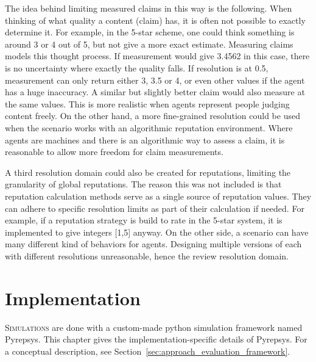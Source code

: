 \documentclass[%
    ]{\PathToTumTemplate/thesis/tum_thesis}
\begin{document}
The idea behind limiting measured claims in this way is the following.
When thinking of what quality a content (claim) has, it is often not possible to exactly determine it.
For example, in the 5-star scheme, one could think something is around 3 or 4 out of 5, but not give a more exact estimate.
Measuring claims models this thought process.
If measurement would give 3.4562 in this case, there is no uncertainty where exactly the quality falls.
If resolution is at 0.5, measurement can only return either 3, 3.5 or 4, or even other values if the agent has a huge inaccuracy.
A similar but slightly better claim would also measure at the same values.
This is more realistic when agents represent people judging content freely.
On the other hand, a more fine-grained resolution could be used when the scenario works with an algorithmic reputation environment.
Where agents are machines and there is an algorithmic way to assess a claim, it is reasonable to allow more freedom for claim measurements.

A third resolution domain could also be created for reputations, limiting the granularity of global reputations.
The reason this was not included is that reputation calculation methods serve as a single source of reputation values.
They can adhere to specific resolution limits as part of their calculation if needed.
For example, if a reputation strategy is build to rate in the 5-star system, it is implemented to give integers [1,5] anyway.
On the other side, a scenario can have many different kind of behaviors for agents.
Designing multiple versions of each with different resolutions unreasonable, hence the review resolution domain.




\chapter{Implementation}\label{chap:implementation}

\lettrine{S}{imulations} are done with a custom-made python simulation framework named Pyrepsys.
This chapter gives the implementation-specific details of Pyrepsys. 
For a conceptual description, see Section~\ref{sec:approach_evaluation_framework}.
\end{document}
